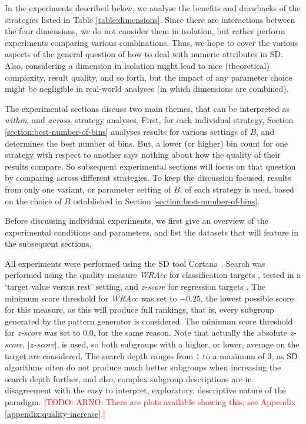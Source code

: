 \documentclass[smallextended]{svjour3}
\newcommand{\todo}[1]{\textcolor{red}{[TODO: #1]}}
\newcommand{\qm}{\emph}
\newcommand{\absz}{$\lvert$$z$-score$\rvert$}
\newcommand{\sd}{SD}
\begin{document}
In the experiments described below, we analyse the benefits and drawbacks of the strategies listed in Table \ref{table:dimensions}.
Since there are interactions between the four dimensions, we do not consider them in isolation, but rather perform experiments comparing various combinations.
Thus, we hope to cover the various aspects of the general question of how to deal with numeric attributes in \sd{}.
Also, considering a dimension in isolation might lead to nice (theoretical) complexity, result quality, and so forth, but the impact of any parameter choice might be negligible in real-world analyses (in which dimensions are combined).

The experimental sections discuss two main themes, that can be interpreted as \emph{within}, and \emph{across}, strategy analyses.
First, for each individual strategy, Section \ref{section:best-number-of-bins} analyses results for various settings of $B$, and determines the best number of bins.
But, a lower (or higher) bin count for one strategy with respect to another says nothing about how the quality of their results compare.
So subsequent experimental sections will focus on that question by comparing across different strategies.
To keep the discussion focused, results from only one variant, or parameter setting of $B$, of each strategy is used, based on the choice of $B$ established in Section \ref{section:best-number-of-bins}.

Before discussing individual experiments, we first give an overview of the experimental conditions and parameters, and list the datasets that will feature in the subsequent sections.

All experiments were performed using the \sd{} tool Cortana \cite{meeng:2011:cortana}.
Search was performed using the quality measure \qm{WRAcc} for classification targets \cite{lavrac:1999}, tested in a `target value versus rest' setting, and \qm{z-score} for regression targets \cite{pieters:2010}.
The minimum score threshold for \qm{WRAcc} was set to $-0.25$, the lowest possible score for this measure, as this will produce full rankings, that is, every subgroup generated by the pattern generator is considered.
The minimum score threshold for \qm{z-score} was set to $0.0$, for the same reason.
Note that actually the absolute \qm{z-score}, \qm{\absz}, is used, so both subgroups with a higher, or lower, average on the target are considered.
The search depth ranges from $1$ to a maximum of $3$, as \sd{} algorithms often do not produce much better subgroups when increasing the search depth further, and also, complex subgroup descriptions are in disagreement with the easy to interpret, exploratory, descriptive nature of the paradigm.
\todo{ARNO: There are plots available showing this, see Appendix \ref{appendix:quality-increase}.}
\end{document}
